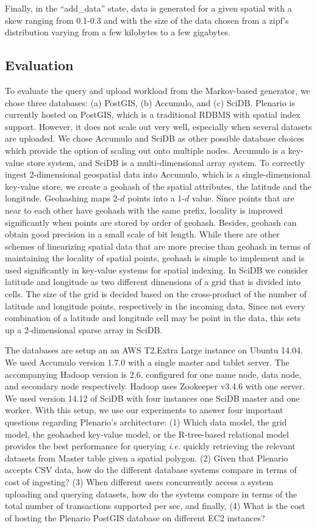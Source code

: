 \documentclass[11pt]{article}
\begin{document}
Finally, in the ``add\_data'' state, data is generated for a given spatial with a skew ranging from 0.1-0.3 and with the size of the data chosen from a zipf's distribution varying from a few kilobytes to a few gigabytes.  


\subsection{Evaluation}
To evaluate the query and upload workload from the Markov-based generator, we chose three databases: (a) PostGIS, (b) Accumulo, and (c) SciDB. Plenario is currently hosted on PostGIS, which is a traditional RDBMS with spatial index support. However, it does not scale out very well, especially when several datasets are uploaded. We chose Accumulo and SciDB as other possible database choices which provide the option of scaling out onto multiple nodes. Accumulo is a key-value store system, and SciDB is a multi-dimensional array system. To correctly ingest 2-dimensional geospatial data into Accumulo, which is a single-dimensional key-value store, we create a geohash of the spatial attributes, the latitude and the longitude. Geohashing maps 2-$d$ points into a 1-$d$ value. Since points that are near to each other have geohash with the same prefix, locality is improved significantly when points are stored by order of geohash. 
Besides, geohash can obtain good precision in a small scale of bit length. While there are other schemes of linearizing spatial data that are more precise than geohash in terms of maintaining the locality of spatial points, geohash is simple to implement and is used significantly in key-value systems for spatial indexing. In SciDB we consider latitude and longitude as two different dimensions of a grid that is divided into cells. The size of the grid is decided based on the cross-product of the number of latitude and longitude points, respectively in the incoming data. Since not every combination of a latitude and longitude cell may be point in the data, this sets up a 2-dimensional sparse array in SciDB. 

The databases are setup an an AWS T2.Extra Large instance on Ubuntu 14.04. We used Accumulo version 1.7.0 with a single master and tablet server. The accompanying Hadoop version is 2.6. configured for one name node, data node, and secondary node respectively. Hadoop uses Zookeeper v3.4.6 with one server. We used version 14.12 of SciDB with four instances one SciDB master and one worker. With this setup, we use our experiments to answer four important questions regarding Plenario's architecture: (1) Which data model, the grid model, the geohashed key-value model, or the R-tree-based relational model provides the best performance for querying \emph{i.e.} quickly retrieving the relevant datasets from Master table given a spatial polygon. (2) Given that Plenario accepts CSV data, how do the different database systems compare in terms of cost of ingesting? (3) When different users concurrently access a system uploading and querying datasets, how do the systems compare in terms of the total number of transactions supported per sec, and finally, (4) What is the cost of hosting the Plenario PostGIS database on different EC2 instances?
\end{document}
